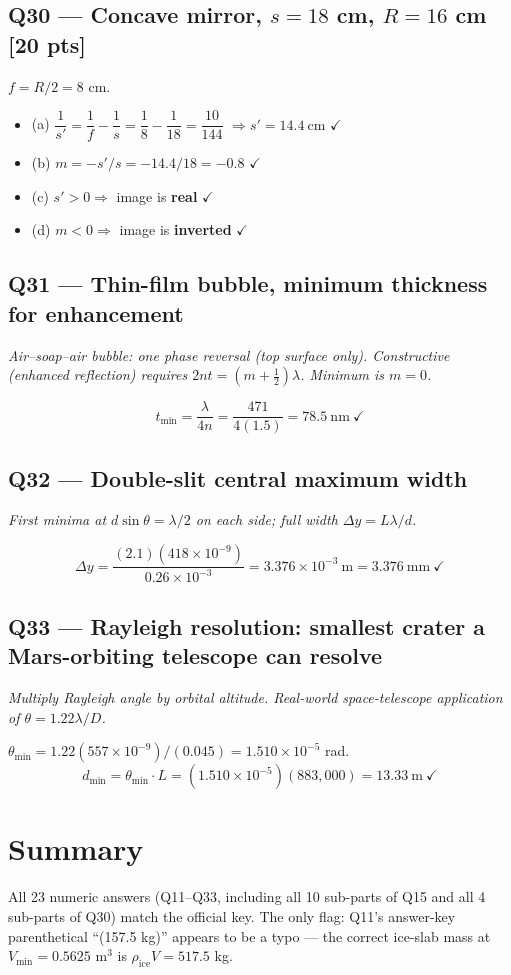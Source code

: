 \documentclass[11pt]{article}
\newcommand{\checkmk}{\ensuremath{\checkmark}}
\begin{document}
\subsection*{Q30 --- Concave mirror, \(s=18\) cm, \(R=16\) cm [20 pts]}
\(f = R/2 = 8\) cm.
\begin{itemize}[leftmargin=*]
\item (a) \(\dfrac{1}{s'} = \dfrac{1}{f}-\dfrac{1}{s} = \dfrac{1}{8}-\dfrac{1}{18} = \dfrac{10}{144}\) \(\Rightarrow s' = \boxed{14.4\ \mathrm{cm}}\) \checkmk
\item (b) \(m = -s'/s = -14.4/18 = \boxed{-0.8}\) \checkmk
\item (c) \(s' > 0 \Rightarrow\) image is \textbf{real} \checkmk
\item (d) \(m < 0 \Rightarrow\) image is \textbf{inverted} \checkmk
\end{itemize}

\subsection*{Q31 --- Thin-film bubble, minimum thickness for enhancement}
\emph{Air--soap--air bubble: one phase reversal (top surface only). Constructive (enhanced reflection) requires \(2nt = (m+\tfrac12)\lambda\). Minimum is \(m=0\).}

\[t_{\min} = \frac{\lambda}{4n} = \frac{471}{4(1.5)} = \boxed{78.5\ \mathrm{nm}}\ \checkmk\]

\subsection*{Q32 --- Double-slit central maximum width}
\emph{First minima at \(d\sin\theta = \lambda/2\) on each side; full width \(\Delta y = L\lambda/d\).}

\[\Delta y = \frac{(2.1)(418\times 10^{-9})}{0.26\times 10^{-3}} = 3.376\times 10^{-3}\ \mathrm{m} = \boxed{3.376\ \mathrm{mm}}\ \checkmk\]

\subsection*{Q33 --- Rayleigh resolution: smallest crater a Mars-orbiting telescope can resolve}
\emph{Multiply Rayleigh angle by orbital altitude. Real-world space-telescope application of \(\theta = 1.22\lambda/D\).}

\(\theta_{\min} = 1.22(557\times 10^{-9})/(0.045) = 1.510\times 10^{-5}\) rad.
\[d_{\min} = \theta_{\min}\cdot L = (1.510\times 10^{-5})(883{,}000) = \boxed{13.33\ \mathrm{m}}\ \checkmk\]

\section*{Summary}
All 23 numeric answers (Q11--Q33, including all 10 sub-parts of Q15 and all 4 sub-parts of Q30) match the official key. The only flag: Q11's answer-key parenthetical ``(157.5 kg)'' appears to be a typo --- the correct ice-slab mass at \(V_{\min}=0.5625\) m\(^3\) is \(\rho_{\mathrm{ice}}V = 517.5\) kg.
\end{document}
